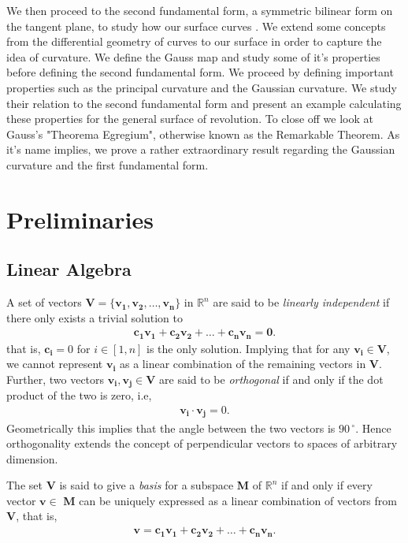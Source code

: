 \documentclass{UKZNcomp}
\newcommand{\vect}[1]{\mathbf{#1}} %
\theoremstyle{definition}
\theoremstyle{remark}
\begin{document}
We then proceed to the second fundamental form, a symmetric bilinear form on the tangent plane, to study how our surface curves \cite{Weisstein1}. We extend some concepts from the differential geometry of curves to our surface in order to capture the idea of curvature. We define the Gauss map and study some of it's properties before defining the second fundamental form. We proceed by defining important properties such as the principal curvature and the Gaussian curvature. We study their relation to the second fundamental form and present an example calculating these properties for the general surface of revolution. To close off we look at Gauss's "Theorema Egregium", otherwise known as the Remarkable Theorem. As it's name implies, we prove a rather extraordinary result regarding the Gaussian curvature and the first fundamental form.

\clearpage

\chapter{Preliminaries}

\section{Linear Algebra}
\label{sec:linearalgebra}

A set of vectors $ \vect{V} = \{\vect {v_1},\vect {v_2},\ldots,\vect {v_n}\} $ in  $\mathbb{R}^{n}$ are said to be \textit{linearly independent} if there only exists a trivial solution to 
\begin{align*}
 \vect {c_1{v_1}} + \vect {c_2{v_2}} + \ldots + \vect {c_n{v_n}} = \vect 0.
\end{align*}
that is, $ \boldsymbol{c_i} = 0 $ for $ i \in [1,n] $ is the only solution. Implying that for any $ \vect{v_i} \in \vect{V} $, we cannot represent $\vect{v_i}$ as a linear combination of the remaining vectors in $\vect{V}$. Further, two vectors $\vect{v_i},\vect{v_j} \in \vect{V}$ are said to be \textit{orthogonal} if and only if the dot product of the two is zero, i.e,
\begin{align*}
\vect{v_i} \cdot \vect{v_j} = 0.
\end{align*}
Geometrically this implies that the angle between the two vectors is $90\,^{\circ}$. Hence orthogonality extends the concept of perpendicular vectors to spaces of arbitrary dimension.

The set $ \vect{V} $ is said to give a \textit{basis} for a subspace \textbf{M} of $\mathbb{R}^{n} $ if and only if every vector $ \vect{v} \in$ \textbf{M} can be uniquely expressed as a linear combination of vectors from $\vect{V}$, that is, 
\begin{align*}
\vect{v} = \vect {c_1{v_1}} + \vect {c_2{v_2}} + \ldots + \vect {c_n{v_n}}.
\end{align*}
\end{document}
